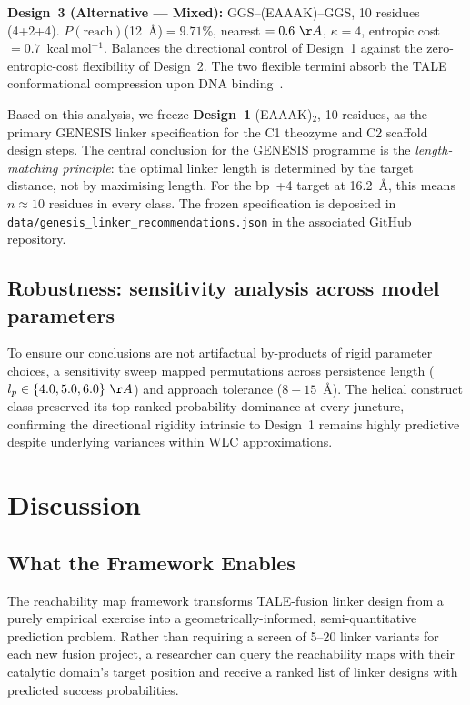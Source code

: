 \documentclass[11pt,a4paper]{article}
\newcommand{\angstrom}{\AA}
\newcommand{\kcal}{kcal\,mol$^{-1}$}
\newcommand{\preach}{P(\mathrm{reach})}
\begin{document}
\textbf{Design~3 (Alternative --- Mixed):} GGS--(EAAAK)--GGS, 10 residues (4+2+4).
$\preach$(12~\AA)$ = 9.71\%$, nearest $= 0.6~\angstrom$, $\kappa = 4$,
entropic cost $= 0.7$~\kcal. Balances the directional control of Design~1 against
the zero-entropic-cost flexibility of Design~2. The two flexible termini absorb the
TALE conformational compression upon DNA binding~\citep{Mak2012}.

Based on this analysis, we freeze \textbf{Design~1} (EAAAK)$_2$, 10 residues, as the
primary GENESIS linker specification for the C1 theozyme and C2 scaffold design steps.
The central conclusion for the GENESIS programme is the \textit{length-matching principle}:
the optimal linker length is determined by the target distance, not by maximising length.
For the bp~+4 target at 16.2~\AA, this means $n \approx 10$ residues in every class.
The frozen specification is deposited in \texttt{data/genesis\_linker\_recommendations.json}
in the associated GitHub repository.

\subsection{Robustness: sensitivity analysis across model parameters}
\label{subsec:sensitivity}

To ensure our conclusions are not artifactual by-products of rigid parameter choices, 
a sensitivity sweep mapped permutations across persistence length ($l_p \in \{4.0, 5.0, 6.0\}~\angstrom$) 
and approach tolerance ($8-15$~\angstrom). The helical construct class preserved its top-ranked  
probability dominance at every juncture, confirming the directional rigidity intrinsic
to Design~1 remains highly predictive despite underlying variances within WLC approximations.

\section{Discussion}
\label{sec:discussion}

\subsection{What the Framework Enables}

The reachability map framework transforms TALE-fusion linker design from a purely
empirical exercise into a geometrically-informed, semi-quantitative prediction problem.
Rather than requiring a screen of 5--20 linker variants for each new fusion project,
a researcher can query the reachability maps with their catalytic domain's target position
and receive a ranked list of linker designs with predicted success probabilities.
\end{document}
